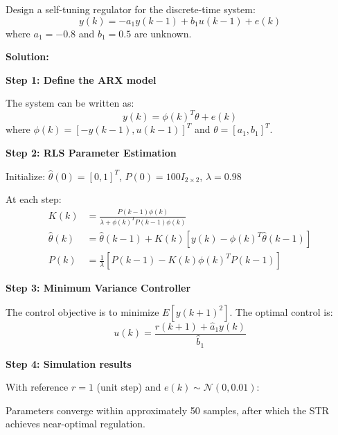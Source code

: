 \begin{example}
\label{ex:str_design}
Design a self-tuning regulator for the discrete-time system:
\begin{equation}
y(k) = -a_1 y(k-1) + b_1 u(k-1) + e(k)
\end{equation}
where $a_1 = -0.8$ and $b_1 = 0.5$ are unknown.

\textbf{Solution:}

\textbf{Step 1: Define the ARX model}

The system can be written as:
\begin{equation}
y(k) = \phi(k)^T \theta + e(k)
\end{equation}
where $\phi(k) = [-y(k-1), u(k-1)]^T$ and $\theta = [a_1, b_1]^T$.

\textbf{Step 2: RLS Parameter Estimation}

Initialize: $\hat{\theta}(0) = [0, 1]^T$, $P(0) = 100 I_{2\times 2}$, $\lambda = 0.98$

At each step:
\begin{align}
K(k) &= \frac{P(k-1)\phi(k)}{\lambda + \phi(k)^T P(k-1)\phi(k)} \\
\hat{\theta}(k) &= \hat{\theta}(k-1) + K(k)[y(k) - \phi(k)^T\hat{\theta}(k-1)] \\
P(k) &= \frac{1}{\lambda}[P(k-1) - K(k)\phi(k)^T P(k-1)]
\end{align}

\textbf{Step 3: Minimum Variance Controller}

The control objective is to minimize $E[y(k+1)^2]$. The optimal control is:
\begin{equation}
u(k) = \frac{r(k+1) + \hat{a}_1 y(k)}{\hat{b}_1}
\end{equation}

\textbf{Step 4: Simulation results}

With reference $r = 1$ (unit step) and $e(k) \sim \mathcal{N}(0, 0.01)$:

\begin{center}
\end{center}

Parameters converge within approximately 50 samples, after which the STR achieves near-optimal regulation.
\end{example}

